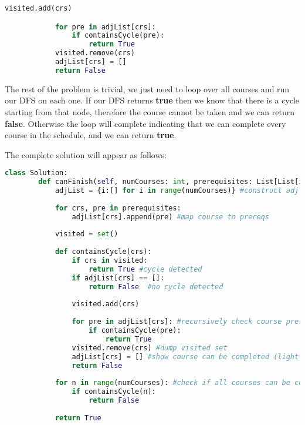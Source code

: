 \documentclass{article}
\begin{document}
\begin{flushleft}
\begin{lstlisting}[language=python]
            visited.add(crs)

            for pre in adjList[crs]:
                if containsCycle(pre):
                    return True
            visited.remove(crs)
            adjList[crs] = []
            return False
    \end{lstlisting}
\end{flushleft}
\begin{flushleft}
    The rest of the problem is trivial, we just need to loop over all courses and run our DFS on each one.
    If our DFS returns \textbf{true} then we know that there is a cycle starting from that node, therefore the course cannot be taken and we can return \textbf{false}.
    Otherwise the loop will complete indicating that we can complete every course in the schedule, and we can return \textbf{true}.
\end{flushleft}
\begin{flushleft}
    The complete solution will appear as follows:
    \begin{lstlisting}[language=python]
    class Solution:
        def canFinish(self, numCourses: int, prerequisites: List[List[int]]) -> bool:
            adjList = {i:[] for i in range(numCourses)} #construct adj list
    
            for crs, pre in prerequisites:
                adjList[crs].append(pre) #map course to prereqs
    
            visited = set()
    
            def containsCycle(crs):
                if crs in visited:
                    return True #cycle detected
                if adjList[crs] == []:
                    return False  #no cycle detected
    
                visited.add(crs)
    
                for pre in adjList[crs]: #recursively check course prereqs
                    if containsCycle(pre):
                        return True
                visited.remove(crs) #dump visited set
                adjList[crs] = [] #show course can be completed (light memoization)
                return False
    
            for n in range(numCourses): #check if all courses can be completed
                if containsCycle(n):
                    return False
    
            return True    
    \end{lstlisting}
\end{flushleft}
\end{document}
